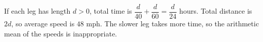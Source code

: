 If each leg has length $ d>0 $, total time is $\dfrac{d}{40}+\dfrac{d}{60}=\dfrac{d}{24}$ hours. Total distance is $ 2d $, so average speed is $\boxed{48\text{ mph}}$. The slower leg takes more time, so the arithmetic mean of the speeds is inappropriate.
